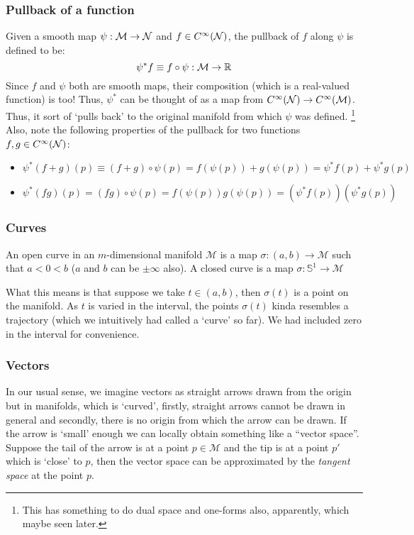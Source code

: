 \subsubsection{Pullback of a function}
\begin{figure}[H]
  \centering
  
\end{figure}
Given a smooth map $\psi:\mathcal M \rightarrow \mathcal N$ and $f\in C^\infty(\mathcal N)$, the pullback of $f$ along $\psi$ is defined to be:
$$\psi^*f\equiv f\circ \psi : \mathcal M\rightarrow \mathbb{R}$$
Since $f$ and $\psi$ both are smooth maps, their composition (which is a real-valued function) is too! Thus, $\psi^*$ can be thought of as a map from $C^\infty(\mathcal N) \rightarrow C^\infty(\mathcal M)$. Thus, it sort of `pulls back' to the original manifold from which $\psi$ was defined. \footnote{This has something to do dual space and one-forms also, apparently, which maybe seen later.} Also, note the following properties of the pullback for two functions $f,g \in C^\infty(\mathcal N)$:
\begin{itemize}
  \item $\psi^*(f+g)(p) \equiv (f+g)\circ \psi(p) = f(\psi(p))+g(\psi(p)) = \psi^*f(p)+\psi^*g(p)$
  \item $\psi^*(fg)(p) = (fg)\circ \psi(p) = f(\psi(p))g(\psi(p)) = (\psi^*f(p))(\psi^*g(p))$
\end{itemize}
\subsubsection{Curves}
\begin{definition}[Curve]
  An open curve in an $m$-dimensional manifold $\mathcal{M}$ is a map $\sigma:(a,b)\rightarrow \mathcal{M}$ such that $a<0<b$ ($a$ and $b$ can be $\pm \infty$ also). A closed curve is a map $\sigma:\mathbb{S}^1\rightarrow \mathcal{M}$

\end{definition}
What this means is that suppose we take $t\in (a,b)$, then $\sigma(t)$ is a point on the manifold. As $t$ is varied in the interval, the points $\sigma(t)$ kinda resembles a trajectory (which we intuitively had called a `curve' so far). We had included zero in the interval for convenience. 
\subsubsection{Vectors}
In our usual sense, we imagine vectors as straight arrows drawn from the origin but in manifolds, which is `curved', firstly, straight arrows cannot be drawn in general and secondly, there is no origin from which the arrow can be drawn. If the arrow is `small' enough we can locally obtain something like a ``vector space''. Suppose the tail of the arrow is at a point $p\in \mathcal{M}$ and the tip is at a point $p'$ which is `close' to $p$, then the vector space can be approximated by the \textit{tangent space} at the point $p$. 
